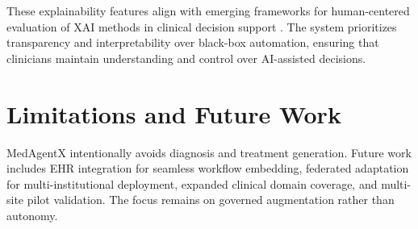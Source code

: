 \documentclass[conference]{IEEEtran}
\begin{document}
These explainability features align with emerging frameworks for human-centered evaluation of XAI methods in clinical decision support \cite{xai_human_centered_2025}. The system prioritizes transparency and interpretability over black-box automation, ensuring that clinicians maintain understanding and control over AI-assisted decisions.

\section{Limitations and Future Work}
MedAgentX intentionally avoids diagnosis and treatment generation. Future work includes EHR integration for seamless workflow embedding, federated adaptation for multi-institutional deployment, expanded clinical domain coverage, and multi-site pilot validation. The focus remains on governed augmentation rather than autonomy.
\end{document}
